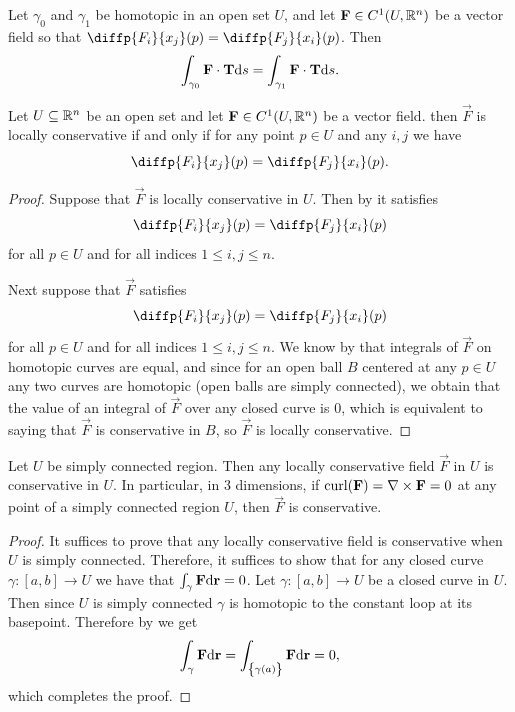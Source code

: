 \documentclass[11pt,a4paper]{article}
\begin{document}
\begin{proposition}
  \label{prop:integral-on-homotopic-loops}
  Let $\gamma_0$ and $\gamma_1$ be homotopic in an open set $U$,
  and let $\boldsymbol{\mathbf{F}} \in C^1(U,\mathbb{R}^n)$ be a vector field so that
  $\diffp{{F_i}}{{x_j}}(p) = \diffp{{F_j}}{{x_i}}(p)$.
  Then
  \[
    \int_{\gamma_0} \boldsymbol{\mathbf{F}} \cdot \boldsymbol{\mathbf{T}} \mathrm{d} s =
    \int_{\gamma_1} \boldsymbol{\mathbf{F}} \cdot \boldsymbol{\mathbf{T}} \mathrm{d} s.
  \]
\end{proposition}

\begin{proposition}
  \label{prop:characterizing-locally-conservative-fields}
  Let $U \subseteq \mathbb{R}^n$ be an open set and
  let $\boldsymbol{\mathbf{F}} \in C^1(U,\mathbb{R}^n)$ be a vector field.
  then $\vec F$ is locally conservative if and only if
  for any point $p \in U$ and any $i,j$ we have
  \[
    \diffp{{F_i}}{{x_j}}(p) =
    \diffp{{F_j}}{{x_i}}(p).
  \]
\end{proposition}
\begin{proof}
  Suppose that $\vec F$ is locally conservative in $U$.
  Then by 
  it satisfies
  \[
    \diffp{{F_i}}{{x_j}}(p) = \diffp{{F_j}}{{x_i}}(p)
  \]
  for all $p \in U$ and for all indices $1 \le i,j \le n$.

  Next suppose that $\vec F$ satisfies
  \[
    \diffp{{F_i}}{{x_j}}(p) = \diffp{{F_j}}{{x_i}}(p)
  \]
  for all $p \in U$ and for all indices $1 \le i,j \le n$.
  We know by 
  that integrals of $\vec F$ on homotopic curves are equal,
  and since for an open ball $B$ centered at any $p \in U$ any
  two curves are homotopic (open balls are simply connected),
  we obtain that the value of an integral of $\vec F$ over any closed
  curve is $0$, which is equivalent to saying
  that $\vec F$ is conservative in $B$,
  so $\vec F$ is locally conservative.
\end{proof}

\begin{theorem}
  \label{thm:simply-connected-locally-globally-conservative-fields}
  Let $U$ be simply connected region.
  Then any locally conservative field $\vec F$ in $U$ is conservative in $U$.
  In particular, in $3$ dimensions,
  if $\operatorname{curl}(\boldsymbol{\mathbf{F}}) = \nabla \times \boldsymbol{\mathbf{F}} = 0$
  at any point of a simply connected region $U$, then $\vec F$ is conservative.
\end{theorem}
\begin{proof}
  It suffices to prove that any locally conservative field is conservative
  when $U$ is simply connected.
  Therefore, it suffices to show that for any closed curve
  $\gamma \colon [a,b] \to U$
  we have that $\int_{\gamma} \boldsymbol{\mathbf{F}} \mathrm{d}\boldsymbol{\mathbf{r}} = 0$.
  Let $\gamma \colon [a,b] \to U$ be a closed curve in $U$.
  Then since $U$ is simply connected $\gamma$ is homotopic to the constant
  loop at its basepoint.
  Therefore by  we get
  \[
    \int_{\gamma} \boldsymbol{\mathbf{F}} \mathrm{d}\boldsymbol{\mathbf{r}} =
    \int_{\left\{\gamma(a)\right\}} \boldsymbol{\mathbf{F}} \mathrm{d}\boldsymbol{\mathbf{r}} =
    0,
  \]
  which completes the proof.
\end{proof}
\end{document}
